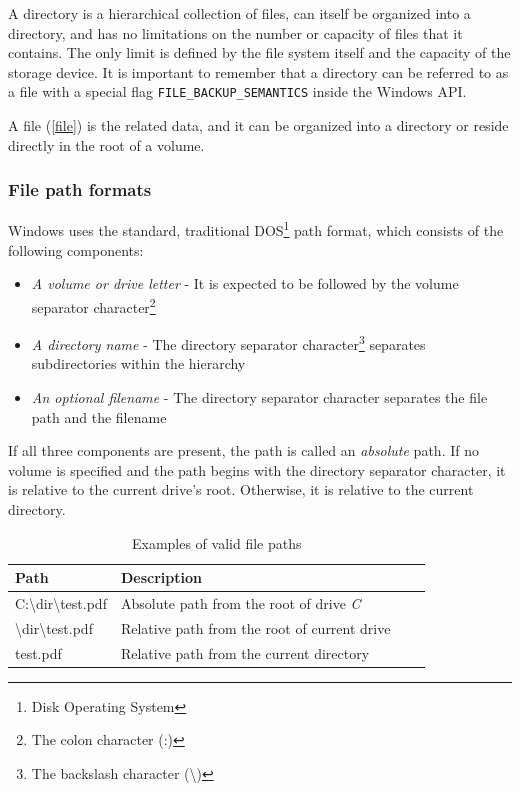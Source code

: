 A directory is a hierarchical collection of files, can itself be organized into a directory, and has no limitations on the number or capacity of files that it contains. The only limit is defined by the file system itself and the capacity of the storage device.\cite{WinDirectoryMgmt} It is important to remember that a directory can be referred to as a file with a special flag \lstinline{FILE_BACKUP_SEMANTICS} inside the Windows API.

A file (\ref{file}) is the related data, and it can be organized into a directory or reside directly in the root of a volume.

\subsubsection{File path formats}
Windows uses the standard, traditional DOS\footnote{Disk Operating System} path format, which consists of the following components:

\begin{itemize}
    \item \textit{A volume or drive letter} - It is expected to be followed by the volume separator character\footnote{The colon character (:)}
    \item \textit{A directory name} - The directory separator character\footnote{The backslash character (\textbackslash{})} separates subdirectories within the hierarchy
    \item \textit{An optional filename} - The directory separator character separates the file path and the filename
\end{itemize}

If all three components are present, the path is called an \textit{absolute} path. If no volume is specified and the path begins with the directory separator character, it is relative to the current drive's root. Otherwise, it is relative to the current directory.\cite{WinPathFormats}

\begin{table}[!hbt]
\centering
\caption{Examples of valid file paths}
\label{filepathsex}
\begin{tabular}{|l|l|l|l|}
\hline
\textbf{Path} & \textbf{Description} \\ \hline
C:\textbackslash{}dir\textbackslash{}test.pdf       & Absolute path from the root of drive \textit{C}    \\ \hline
\textbackslash{}dir\textbackslash{}test.pdf      & Relative path from the root of current drive     \\ \hline
test.pdf       & Relative path from the current directory     \\ \hline
\end{tabular}
\end{table}

